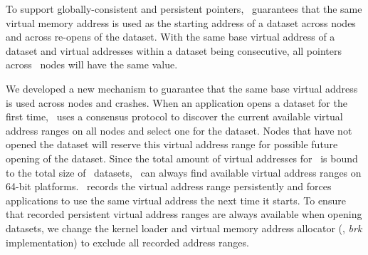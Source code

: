 To support globally-consistent and persistent pointers, 
\hotpot\ guarantees that the same virtual memory address is used as the starting address of a dataset across nodes and across re-opens of the dataset.
With the same base virtual address of a dataset and virtual addresses within a dataset being consecutive, 
all pointers across \hotpot\ nodes will have the same value. 

We developed a new mechanism to guarantee that the same base virtual address is used across nodes and crashes.
When an application opens a dataset for the first time, \hotpot\ uses a consensus protocol to discover the current 
available virtual address ranges on all nodes and select one for the dataset. 
Nodes that have not opened the dataset will reserve this virtual address range for possible future opening of the dataset.
Since the total amount of virtual addresses for \dsnvm\ is bound to the total size of \dsnvm\ datasets, 
\hotpot\ can always find available virtual address ranges on 64-bit platforms.
\hotpot\ records the virtual address range persistently and forces applications to use the same virtual address 
the next time it starts.
To ensure that recorded persistent virtual address ranges are always available when opening datasets, 
we change the kernel loader and virtual memory address allocator (\ie, {\it brk} implementation) to exclude 
all recorded address ranges.
